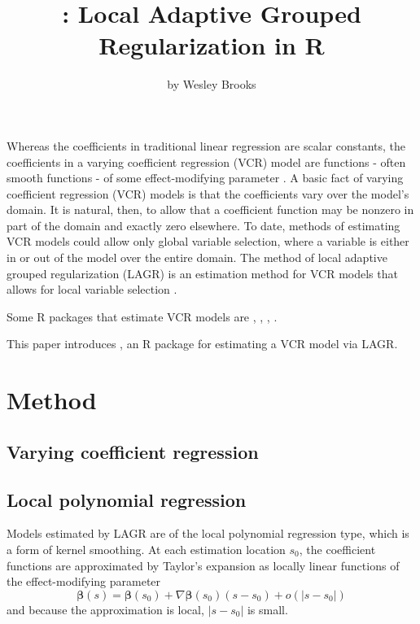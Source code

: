 \title{: Local Adaptive Grouped Regularization in R}
\author{by Wesley Brooks}

\maketitle




Whereas the coefficients in traditional linear regression are scalar constants, the coefficients in a varying coefficient regression (VCR) model are functions - often smooth functions - of some effect-modifying parameter \citep{Cleveland-Grosse-1991,Hastie-Tibshirani-1993}. A basic fact of varying coefficient regression (VCR) models is that the coefficients vary over the model's domain. It is natural, then, to allow that a coefficient function may be nonzero in part of the domain and exactly zero elsewhere. To date, methods of estimating VCR models could allow only global variable selection, where a variable is either in or out of the model over the entire domain. The method of local adaptive grouped regularization (LAGR) is an estimation method for VCR models that allows for local variable selection \citep{Brooks-Zhu-Lu-2014}.

Some R packages that estimate VCR models are , , , . 
 
This paper introduces , an R package for estimating a VCR model via LAGR. 

\section{Method}
\subsection{Varying coefficient regression}


\subsection{Local polynomial regression}
Models estimated by LAGR are of the local polynomial regression type, which is a form of kernel smoothing. At each estimation location $s_0$, the coefficient functions are approximated by Taylor's expansion as locally linear functions of the effect-modifying parameter
\begin{equation}
\bm{\beta}(s) = \bm{\beta}(s_0) + \nabla \bm{\beta}(s_0) (s - s_0) + o(|s-s_0|)
\end{equation}
and because the approximation is local, $|s-s_0|$ is small.

